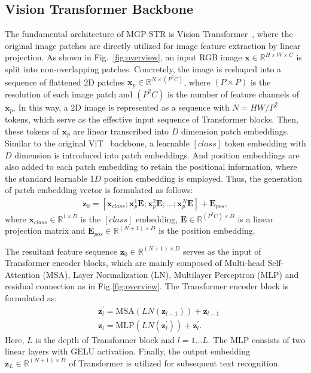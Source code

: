 \documentclass[runningheads]{llncs}
\begin{document}
\subsection{Vision Transformer Backbone}
The fundamental architecture of MGP-STR is Vision Transformer~\cite{dosovitskiy2020image,deit}, where the original image patches are directly utilized for image feature extraction by linear projection. 
As shown in Fig.~\ref{fig:overview}, an input RGB image  $ \mathbf{x} \in  \mathbb{R}^{H \times W \times C} $  is split into non-overlapping patches.
Concretely, the image is reshaped  into a sequence of flattened 2D patches $ \mathbf{x}_p \in  \mathbb{R}^{N \times (P^2 C)} $,
where $(P \times P) $ is the resolution of each image patch and $(P^2 C)$ is the number of feature channels of $ \mathbf{x}_p$. 
In this way, a 2D image is represented as a sequence with $N = HW/P^2$ tokens, which serve as the effective input sequence of Transformer blocks.
Then, these tokens of $ \mathbf{x}_p$  are linear transcribed into $D$ dimension patch embeddings. 
Similar to the original ViT~\cite{dosovitskiy2020image} backbone, a learnable  $[class]$ token embedding with $D$ dimension is introduced into patch embeddings.
And position embeddings are also added to each patch embedding to retain the positional information,
where the standard learnable 1$D$ position embedding is employed.
Thus, the generation of patch embedding vector is formulated as follows:
\begin{equation}
\begin{split}
\mathbf{z}_0=[\mathbf{x}_{class}; \mathbf{x}^1_p\mathbf{E}; \mathbf{x}^2_p\mathbf{E}; \ldots; \mathbf{x}^N_p\mathbf{E}] + \mathbf{E}_{pos},
\end{split}
\end{equation}
where $\mathbf{x}_{class} \in \mathbb{R}^{ 1 \times D}$ is the $[class]$ embedding,  $\mathbf{E}  \in \mathbb{R}^{ (P^2 C) \times D } $ is a linear projection matrix and  $ \mathbf{E}_{pos} \in \mathbb{R}^{ (N+1) \times D }   $ is the position embedding.

The resultant feature sequence $\mathbf{z}_0  \in \mathbb{R}^{ (N+1) \times D} $ serves as the input of Transformer encoder blocks,
which are mainly composed of Multi-head Self-Attention (MSA), Layer Normalization (LN), Multilayer Perceptron (MLP) and residual connection as in Fig.\ref{fig:overview}. The Transformer encoder block is formulated as:
\begin{equation}
\begin{split}
&\mathbf{z}_{l}^{\prime}=\text{MSA} (LN(\mathbf{z}_{l-1}))+ \mathbf{z}_{l-1}   \\
&\mathbf{z}_{l}=\text{MLP} (LN(\mathbf{z}_{l}^{\prime}))+ \mathbf{z}_{l}^{\prime}.
\end{split}
\end{equation}
Here, $L$ is the depth of Transformer block and  $ l=1 \ldots L $.
The MLP consists of two linear layers with GELU activation.
Finally, the output embedding $ \mathbf{z}_{L} \in \mathbb{R}^{ (N+1) \times D }$ of Transformer is utilized for subsequent text recognition.
\end{document}
